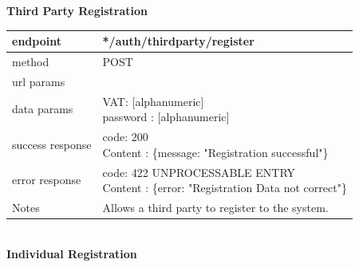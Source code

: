 \begin{legal}
\begin{itemize}
				\textbf{Third Party Registration} \\
			
					\begin{tabularx}{\linewidth}{| l | l |}
						\hline
						endpoint & */auth/thirdparty/register \\
						\hline
						method & POST \\
						\hline
						url params & \\
						\hline
						data params &
						\parbox{0.7\textwidth}{
							\bigskip
							VAT: [alphanumeric]\\
							password : [alphanumeric]\\
							\bigskip
						} \\
						\hline
						success response &
						\parbox{0.7\textwidth}{
							\bigskip
							code: 200\\
							Content : \{message: "Registration successful"\}
							\bigskip
						} \\
						\hline
						error response &
						\parbox{0.7\textwidth}{
							\bigskip
							code: 422 UNPROCESSABLE ENTRY \\
							Content : \{error: "Registration Data not correct"\}
							\bigskip
						} \\
						\hline
						Notes & 
						\parbox{0.7\textwidth}{
							\bigskip Allows a third party to register to the system.
						\bigskip}  \\
						\hline
					\end{tabularx}\\
					
				\textbf{Individual Registration} \\
			

\end{itemize}
\end{legal}
